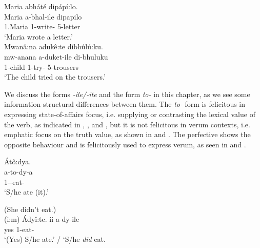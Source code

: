 \documentclass[output=paper]{langscibook}
\begin{document}
\ea
\label{bkm:Ref136287899}
Maria abháté dipápí:lo.\\
\gll
Maria   a-bhal-ile  dipapilo\\
1.Maria  1\SM{}-write-\PFV{}  5-letter\\
\glt
‘Maria wrote a letter.’\\

\ex
\label{bkm:Ref136287901}
Mwanâ:na adukê:te dibhúlú:ku.\\
\gll
mw-anana   a-duket-ile  di-bhuluku\\
1-child  1\SM{}-try-\PFV{}   5-trousers\\
\glt
‘The child tried on the trousers.’\\

\z

We discuss the forms \textit{{}-ile/-ite} and the form \textit{to-} in this chapter, as we see some information-structural differences between them. The \textit{to}{}- form is felicitous in expressing state-of-affairs focus, i.e. supplying or contrasting the lexical value of the verb, as indicated in , , and , but it is not felicitous in verum contexts, i.e. emphatic focus on the truth value, as shown in  and . The perfective shows the opposite behaviour and is felicitously used to express verum, as seen in  and .\largerpage[2]

\ea
\label{bkm:Ref127267278}
Átô:dya.\\
\gll
a-to-dy-a\\
1\SM{}-\TO{}-eat-\FV{}\\
\glt
‘S/he ate (it).’\\

\z

\ex
\label{bkm:Ref127267286}
(She didn’t eat.)\\
(i:m) Ádyî:te.  \jambox*{[verum]}
\gll
ii  a-dy-ile\\
yes   1\SM{}-eat-\PFV{}\\
\glt
‘(Yes) S/he ate.’ / `S/he \textit{did} eat.\\
\end{document}
